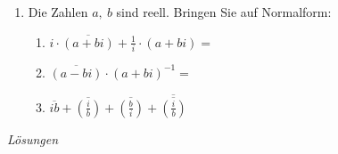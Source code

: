 \begin{ueb}
\begin{enumerate}
        \item Die Zahlen $a,\ b$ sind reell. Bringen Sie auf Normalform:
        \begin{enumerate}
            \item $i\cdot \overline{(a+bi)}+\frac{1}{i}\cdot (a+bi)=$
            \vfill
            \item $\overline{(a-bi)}\cdot (a+bi)^{-1}=$
            \vfill
            \item $\overline{ib}+\overline{\left(\frac{i}{b}\right)}+\overline{\left(\frac{b}{i}\right)}+\overline{\overline{\left(\frac{i}{b}\right)}}$
            \vfill
        \end{enumerate}
    \end{enumerate}
\end{ueb}

\clearpage
\emph{Lösungen}

